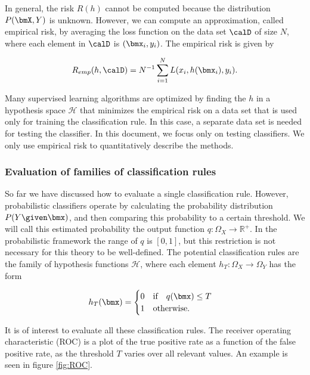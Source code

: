 In general, the risk $R(h)$ cannot be computed because the distribution $P(\bmX,Y)$ is unknown.  However, we can compute an approximation, called empirical risk, by averaging the loss function on the data set $\calD$ of size $N$, where each element in $\calD$ is $(\bmx_i, y_i)$.  The empirical risk is given by 

\begin{equation}
\label{def:empRisk}
R_{emp}(h, \calD) = N^{-1} \sum_{i=1}^N L(x_i, h(\bmx_i), y_i).
\end{equation}

Many supervised learning algorithms are optimized by finding the $h$ in a hypothesis space $\mathcal{H}$ that minimizes the empirical risk on a data set that is used only for training the classification rule.  In this case, a separate data set is needed for testing the classifier.  In this document, we focus only on testing classifiers.  We only use empirical risk to quantitatively describe the methods.

\subsubsection{Evaluation of families of classification rules}
\label{sec:hypothesisSpace}

So far we have discussed how to evaluate a single classification rule.  
However, probabilistic classifiers operate by calculating the probability distribution $P(Y\given\bmx)$, and then comparing this probability to a certain threshold.  
We will call this estimated probability the output function $q: \Omega_X \rightarrow \mathbb{R}^+$.  In the probabilistic framework the range of $q$ is $[0, 1]$, but this restriction is not necessary for this theory to be well-defined.  
The potential classification rules are the family of hypothesis functions $\mathcal{H}$, where each element $h_T:\Omega_X \rightarrow \Omega_Y$ has the form 

\begin{equation}
\label{eq:ht}
h_T(\bmx) = 
\begin{cases}
0 \quad \mbox{if} \quad q(\bmx) \leq T\\
1 \quad \mbox{otherwise.}
\end{cases}
\end{equation}

It is of interest to evaluate all these classification rules.  The receiver operating characteristic (ROC) is a plot of the true positive rate as a function of the false positive rate, as the threshold $T$ varies over all relevant values.  An example is seen in figure \ref{fig:ROC}.

